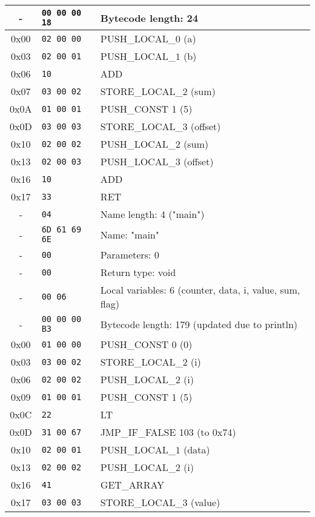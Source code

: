 \documentclass[a4paper,12pt]{article}
\begin{document}
\begin{longtable}{|c|l|p{6cm}|}
    - & \texttt{00 00 00 18} & Bytecode length: 24 \\ \hline
    0x00 & \texttt{02 00 00} & PUSH\_LOCAL\_$0$ (a) \\ \hline
    0x03 & \texttt{02 00 01} & PUSH\_LOCAL\_$1$ (b) \\ \hline
    0x06 & \texttt{10} & ADD \\ \hline
    0x07 & \texttt{03 00 02} & STORE\_LOCAL\_$2$ (sum) \\ \hline
    0x0A & \texttt{01 00 01} & PUSH\_CONST 1 (5) \\ \hline
    0x0D & \texttt{03 00 03} & STORE\_LOCAL\_$3$ (offset) \\ \hline
    0x10 & \texttt{02 00 02} & PUSH\_LOCAL\_$2$ (sum) \\ \hline
    0x13 & \texttt{02 00 03} & PUSH\_LOCAL\_$3$ (offset) \\ \hline
    0x16 & \texttt{10} & ADD \\ \hline
    0x17 & \texttt{33} & RET \\ \hline
    - & \texttt{04} & Name length: 4 ("main") \\ \hline
    - & \texttt{6D 61 69 6E} & Name: "main" \\ \hline
    - & \texttt{00} & Parameters: 0 \\ \hline
    - & \texttt{00} & Return type: void \\ \hline
    - & \texttt{00 06} & Local variables: 6 (counter, data, i, value, sum, flag) \\ \hline
    - & \texttt{00 00 00 B3} & Bytecode length: 179 (updated due to println) \\ \hline
    0x00 & \texttt{01 00 00} & PUSH\_CONST 0 (0) \\ \hline
    0x03 & \texttt{03 00 02} & STORE\_LOCAL\_$2$ (i) \\ \hline
    0x06 & \texttt{02 00 02} & PUSH\_LOCAL\_$2$ (i) \\ \hline
    0x09 & \texttt{01 00 01} & PUSH\_CONST 1 (5) \\ \hline
    0x0C & \texttt{22} & LT \\ \hline
    0x0D & \texttt{31 00 67} & JMP\_IF\_FALSE 103 (to 0x74) \\ \hline
    0x10 & \texttt{02 00 01} & PUSH\_LOCAL\_$1$ (data) \\ \hline
    0x13 & \texttt{02 00 02} & PUSH\_LOCAL\_$2$ (i) \\ \hline
    0x16 & \texttt{41} & GET\_ARRAY \\ \hline
    0x17 & \texttt{03 00 03} & STORE\_LOCAL\_$3$ (value) \\ \hline

\end{longtable}
\end{document}
